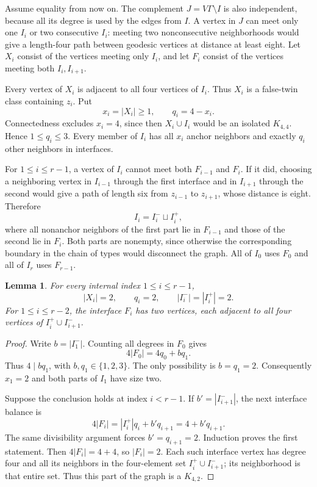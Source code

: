 \documentclass[11pt]{article}
\newtheorem{lemma}[theorem]{Lemma}
\theoremstyle{definition}\newtheorem{definition}[theorem]{Definition}
\begin{document}
Assume equality from now on. The complement $J=V\Gamma\setminus I$
is also independent, because all its degree is used by the edges
from $I$. A vertex in $J$ can meet only one $I_i$ or two consecutive
$I_i$: meeting two nonconsecutive neighborhoods would give a
length-four path between geodesic vertices at distance at least eight.
Let $X_i$ consist of the vertices meeting only $I_i$, and let $F_i$
consist of the vertices meeting both $I_i,I_{i+1}$.

Every vertex of $X_i$ is adjacent to all four vertices of $I_i$.
Thus $X_i$ is a false-twin class containing $z_i$. Put
\[
 x_i=|X_i|\geq1,\qquad q_i=4-x_i.
\]
Connectedness excludes $x_i=4$, since then $X_i\cup I_i$ would
be an isolated $K_{4,4}$. Hence $1\leq q_i\leq3$. Every member
of $I_i$ has all $x_i$ anchor neighbors and exactly $q_i$ other
neighbors in interfaces.

For $1\leq i\leq r-1$, a vertex of $I_i$ cannot meet both
$F_{i-1}$ and $F_i$. If it did, choosing a neighboring vertex in
$I_{i-1}$ through the first interface and in $I_{i+1}$ through the
second would give a path of length six from $z_{i-1}$ to $z_{i+1}$,
whose distance is eight. Therefore
\[
 I_i=I_i^-\sqcup I_i^+,
\]
where all nonanchor neighbors of the first part lie in $F_{i-1}$
and those of the second lie in $F_i$. Both parts are nonempty,
since otherwise the corresponding boundary in the chain of types
would disconnect the graph. All of $I_0$ uses $F_0$ and all of
$I_r$ uses $F_{r-1}$.

\begin{lemma}\label{forced}
For every internal index $1\leq i\leq r-1$,
\[
 |X_i|=2,\qquad q_i=2,\qquad |I_i^-|=|I_i^+|=2.
\]
For $1\leq i\leq r-2$, the interface $F_i$ has two vertices, each
adjacent to all four vertices of $I_i^+\cup I_{i+1}^-$.
\end{lemma}
\begin{proof}
Write $b=|I_1^-|$. Counting all degrees in $F_0$ gives
\[
 4|F_0|=4q_0+bq_1.
\]
Thus $4\mid bq_1$, with $b,q_1\in\{1,2,3\}$. The only possibility
is $b=q_1=2$. Consequently $x_1=2$ and both parts of $I_1$ have size
two.

Suppose the conclusion holds at index $i<r-1$. If
$b'=|I_{i+1}^-|$, the next interface balance is
\[
 4|F_i|=|I_i^+|q_i+b'q_{i+1}=4+b'q_{i+1}.
\]
The same divisibility argument forces $b'=q_{i+1}=2$. Induction proves
the first statement. Then $4|F_i|=4+4$, so $|F_i|=2$.
Each such interface vertex has degree four and all its neighbors
in the four-element set $I_i^+\cup I_{i+1}^-$; its neighborhood is
that entire set. Thus this part of the graph is a $K_{4,2}$.
\end{proof}
\end{document}
